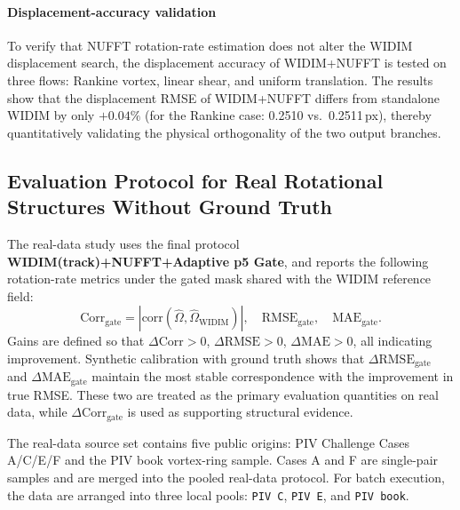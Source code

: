 \documentclass[lettersize,journal]{IEEEtran}
\begin{document}
\paragraph{Displacement-accuracy validation}
To verify that NUFFT rotation-rate estimation does not alter the WIDIM displacement search, the displacement accuracy of WIDIM+NUFFT is tested on three flows: Rankine vortex, linear shear, and uniform translation.
The results show that the displacement RMSE of WIDIM+NUFFT differs from standalone WIDIM by only $+0.04\%$
(for the Rankine case: 0.2510 vs.\ 0.2511\,px),
thereby quantitatively validating the physical orthogonality of the two output branches.

\subsection{Evaluation Protocol for Real Rotational Structures Without Ground Truth}
\label{sec:real_piv}

The real-data study uses the final protocol
\textbf{WIDIM(track)+NUFFT+Adaptive p5 Gate},
and reports the following rotation-rate metrics under the gated mask shared with the WIDIM reference field:
%
\begin{equation}
  \mathrm{Corr}_{\mathrm{gate}}=
  \left|\mathrm{corr}\!\left(\hat{\Omega},\hat{\Omega}_{\mathrm{WIDIM}}\right)\right|,
  \quad
  \mathrm{RMSE}_{\mathrm{gate}},
  \quad
  \mathrm{MAE}_{\mathrm{gate}}.
  \label{eq:real_metrics}
\end{equation}
%
Gains are defined so that
$\Delta\mathrm{Corr}>0$,
$\Delta\mathrm{RMSE}>0$,
$\Delta\mathrm{MAE}>0$, all indicating improvement.
Synthetic calibration with ground truth shows that
$\Delta\mathrm{RMSE}_{\mathrm{gate}}$
and
$\Delta\mathrm{MAE}_{\mathrm{gate}}$
maintain the most stable correspondence with the improvement in true RMSE.
These two are treated as the primary evaluation quantities on real data,
while
$\Delta\mathrm{Corr}_{\mathrm{gate}}$
is used as supporting structural evidence.
\par
The real-data source set contains five public origins:
PIV Challenge Cases A/C/E/F and the PIV book vortex-ring sample.
Cases A and F are single-pair samples and are merged into the pooled real-data protocol.
For batch execution, the data are arranged into three local pools:
\texttt{PIV C}, \texttt{PIV E}, and \texttt{PIV book}.

\end{document}
